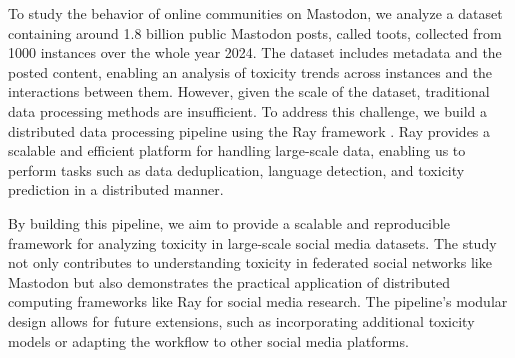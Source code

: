 To study the behavior of online communities on Mastodon, we analyze a dataset containing around 1.8 billion public Mastodon posts, called toots, collected from 1000 instances over the whole year 2024. The dataset includes metadata and the posted content, enabling an analysis of toxicity trends across instances and the interactions between them. However, given the scale of the dataset, traditional data processing methods are insufficient. To address this challenge, we build a distributed data processing pipeline using the Ray framework \cite{moritz:2018}. Ray provides a scalable and efficient platform for handling large-scale data, enabling us to perform tasks such as data deduplication, language detection, and toxicity prediction in a distributed manner.

By building this pipeline, we aim to provide a scalable and reproducible framework for analyzing toxicity in large-scale social media datasets. The study not only contributes to understanding toxicity in federated social networks like Mastodon but also demonstrates the practical application of distributed computing frameworks like Ray for social media research. The pipeline's modular design allows for future extensions, such as incorporating additional toxicity models or adapting the workflow to other social media platforms.

\enlargethispage{\baselineskip}
